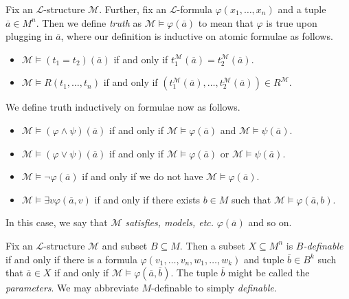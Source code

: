 \documentclass{article}
\begin{document}
\begin{definition}[truth]
	Fix an $\mathcal L$-structure $\mathcal M$. Further, fix an $\mathcal L$-formula $\varphi(x_1,\ldots,x_n)$ and a tuple $\overline a\in M^n$. Then we define \textit{truth} as $\mathcal M\models\varphi(\overline a)$ to mean that $\varphi$ is true upon plugging in $\overline a$, where our definition is inductive on atomic formulae as follows.
	\begin{itemize}
		\item $\mathcal M\models(t_1=t_2)(\overline a)$ if and only if $t_1^\mathcal M(\overline a)=t_2^\mathcal M(\overline a)$.
		\item $\mathcal M\models R(t_1,\ldots,t_n)$ if and only if $\left(t_1^\mathcal M(\overline a),\ldots,t_2^\mathcal M(\overline a)\right)\in R^\mathcal M$.
	\end{itemize}
	We define truth inductively on formulae now as follows.
	\begin{itemize}
		\item $\mathcal M\models(\varphi\land\psi)(\overline a)$ if and only if $\mathcal M\models\varphi(\overline a)$ and $\mathcal M\models\psi(\overline a)$.
		\item $\mathcal M\models(\varphi\lor\psi)(\overline a)$ if and only if $\mathcal M\models\varphi(\overline a)$ or $\mathcal M\models\psi(\overline a)$.
		\item $\mathcal M\models\lnot\varphi(\overline a)$ if and only if we do not have $\mathcal M\models\varphi(\overline a)$.
		\item $\mathcal M\models\exists v\varphi(\overline a,v)$ if and only if there exists $b\in M$ such that $\mathcal M\models\varphi(\overline a,b)$.
	\end{itemize}
	In this case, we say that $\mathcal M$ \textit{satisfies, models, etc.} $\varphi(\overline a)$ and so on.
\end{definition}
\begin{definition}[definable]
	Fix an $\mathcal L$-structure $\mathcal M$ and subset $B\subseteq M$. Then a subset $X\subseteq M^n$ is \textit{$B$-definable} if and only if there is a formula $\varphi(v_1,\ldots,v_n,w_1,\ldots,w_k)$ and tuple $\overline b\in B^k$ such that $\overline a\in X$ if and only if $\mathcal M\models\varphi(\overline a,\overline b)$. The tuple $\overline b$ might be called the \textit{parameters}. We may abbreviate $M$-definable to simply \textit{definable}.
\end{definition}
\end{document}
